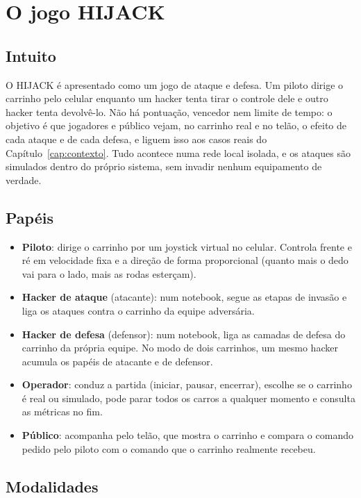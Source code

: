 \documentclass[12pt,openright,oneside,a4paper,english,brazil]{abntex2}
\begin{document}
\chapter{O jogo HIJACK}\label{cap:jogo}

\section{Intuito}

O HIJACK é apresentado como um jogo de ataque e defesa. Um piloto dirige o carrinho pelo celular enquanto um hacker tenta tirar o controle dele e outro hacker tenta devolvê-lo. Não há pontuação, vencedor nem limite de tempo: o objetivo é que jogadores e público vejam, no carrinho real e no telão, o efeito de cada ataque e de cada defesa, e liguem isso aos casos reais do Capítulo~\ref{cap:contexto}. Tudo acontece numa rede local isolada, e os ataques são simulados dentro do próprio sistema, sem invadir nenhum equipamento de verdade.

\section{Papéis}

\begin{itemize}
  \item \textbf{Piloto}: dirige o carrinho por um joystick virtual no celular. Controla frente e ré em velocidade fixa e a direção de forma proporcional (quanto mais o dedo vai para o lado, mais as rodas esterçam).
  \item \textbf{Hacker de ataque} (atacante): num notebook, segue as etapas de invasão e liga os ataques contra o carrinho da equipe adversária.
  \item \textbf{Hacker de defesa} (defensor): num notebook, liga as camadas de defesa do carrinho da própria equipe. No modo de dois carrinhos, um mesmo hacker acumula os papéis de atacante e de defensor.
  \item \textbf{Operador}: conduz a partida (iniciar, pausar, encerrar), escolhe se o carrinho é real ou simulado, pode parar todos os carros a qualquer momento e consulta as métricas no fim.
  \item \textbf{Público}: acompanha pelo telão, que mostra o carrinho e compara o comando pedido pelo piloto com o comando que o carrinho realmente recebeu.
\end{itemize}

\section{Modalidades}
\end{document}
